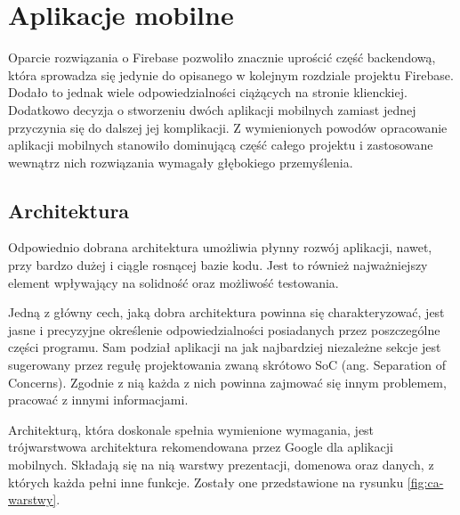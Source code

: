 \chapter{Aplikacje mobilne}
\label{part:applications}

Oparcie rozwiązania o Firebase pozwoliło znacznie uprościć część backendową, która sprowadza się jedynie do opisanego w kolejnym rozdziale projektu Firebase. Dodało to jednak wiele odpowiedzialności ciążących na stronie klienckiej. Dodatkowo decyzja o stworzeniu dwóch aplikacji mobilnych zamiast jednej przyczynia się do dalszej jej komplikacji. Z wymienionych powodów opracowanie aplikacji mobilnych stanowiło dominującą część całego projektu i zastosowane wewnątrz nich rozwiązania wymagały głębokiego przemyślenia.


\section{Architektura}

Odpowiednio dobrana architektura umożliwia płynny rozwój aplikacji, nawet, przy bardzo dużej i ciągle rosnącej bazie kodu. Jest to również najważniejszy element wpływający na solidność oraz możliwość testowania.

Jedną z główny cech, jaką dobra architektura powinna się charakteryzować, jest jasne i precyzyjne określenie odpowiedzialności posiadanych przez poszczególne części programu. Sam podział aplikacji na jak najbardziej niezależne sekcje jest sugerowany przez regułę projektowania zwaną skrótowo SoC (ang. Separation of Concerns). Zgodnie z nią każda z nich powinna zajmować się innym problemem, pracować z innymi informacjami.

Architekturą, która doskonale spełnia wymienione wymagania, jest trójwarstwowa architektura rekomendowana przez Google dla aplikacji mobilnych. Składają się na nią warstwy prezentacji, domenowa oraz danych, z których każda pełni inne funkcje. Zostały one przedstawione na rysunku \ref{fig:ca-warstwy}.

